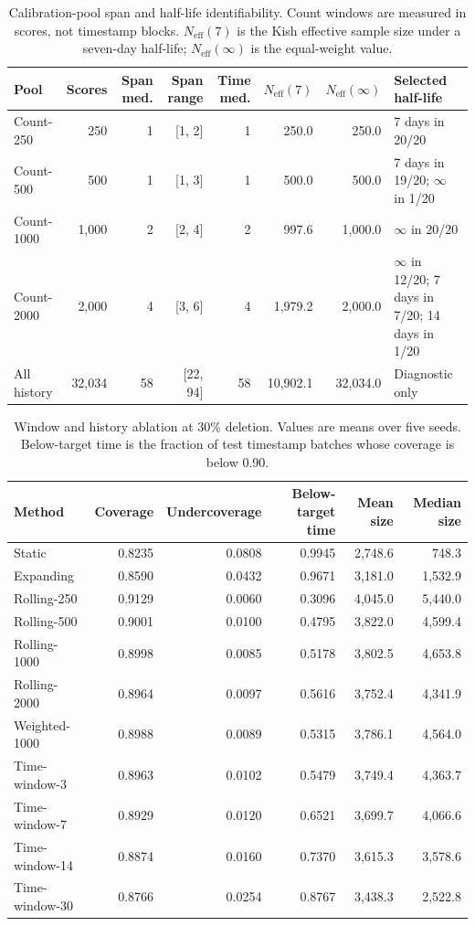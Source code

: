\documentclass[information,article,submit,oneauthor,pdftex]{Definitions/mdpi}
\begin{document}
\begin{table}[t]
\centering
\caption{Calibration-pool span and half-life identifiability. Count windows are
measured in scores, not timestamp blocks. \(N_{\mathrm{eff}}(7)\) is the Kish
effective sample size under a seven-day half-life; \(N_{\mathrm{eff}}(\infty)\)
is the equal-weight value.}
\label{tab:pool-diagnostics}
\scriptsize
\setlength{\tabcolsep}{3.5pt}
\begin{tabular}{lrrrrrrp{}}
\toprule
Pool & Scores & Span med. & Span range & Time med. & \(N_{\mathrm{eff}}(7)\) & \(N_{\mathrm{eff}}(\infty)\) & Selected half-life\\
\midrule
Count-250 & 250 & 1 & [1, 2] & 1 & 250.0 & 250.0 & 7 days in 20/20\\
Count-500 & 500 & 1 & [1, 3] & 1 & 500.0 & 500.0 & 7 days in 19/20; \(\infty\) in 1/20\\
Count-1000 & 1,000 & 2 & [2, 4] & 2 & 997.6 & 1,000.0 & \(\infty\) in 20/20\\
Count-2000 & 2,000 & 4 & [3, 6] & 4 & 1,979.2 & 2,000.0 & \(\infty\) in 12/20; 7 days in 7/20; 14 days in 1/20\\
All history & 32,034 & 58 & [22, 94] & 58 & 10,902.1 & 32,034.0 & Diagnostic only\\
\bottomrule
\end{tabular}
\end{table}

\begin{table}[t]
\centering
\caption{Window and history ablation at 30\% deletion. Values are means over
five seeds. Below-target time is the fraction of test timestamp batches whose
coverage is below 0.90.}
\label{tab:window-ablation}
\footnotesize
\setlength{\tabcolsep}{4pt}
\begin{tabular}{lrrrrr}
\toprule
Method & Coverage & Undercoverage & Below-target time & Mean size & Median size\\
\midrule
Static & 0.8235 & 0.0808 & 0.9945 & 2,748.6 & 748.3\\
Expanding & 0.8590 & 0.0432 & 0.9671 & 3,181.0 & 1,532.9\\
Rolling-250 & 0.9129 & 0.0060 & 0.3096 & 4,045.0 & 5,440.0\\
Rolling-500 & 0.9001 & 0.0100 & 0.4795 & 3,822.0 & 4,599.4\\
Rolling-1000 & 0.8998 & 0.0085 & 0.5178 & 3,802.5 & 4,653.8\\
Rolling-2000 & 0.8964 & 0.0097 & 0.5616 & 3,752.4 & 4,341.9\\
Weighted-1000 & 0.8988 & 0.0089 & 0.5315 & 3,786.1 & 4,564.0\\
Time-window-3 & 0.8963 & 0.0102 & 0.5479 & 3,749.4 & 4,363.7\\
Time-window-7 & 0.8929 & 0.0120 & 0.6521 & 3,699.7 & 4,066.6\\
Time-window-14 & 0.8874 & 0.0160 & 0.7370 & 3,615.3 & 3,578.6\\
Time-window-30 & 0.8766 & 0.0254 & 0.8767 & 3,438.3 & 2,522.8\\
\bottomrule
\end{tabular}
\end{table}
\end{document}

